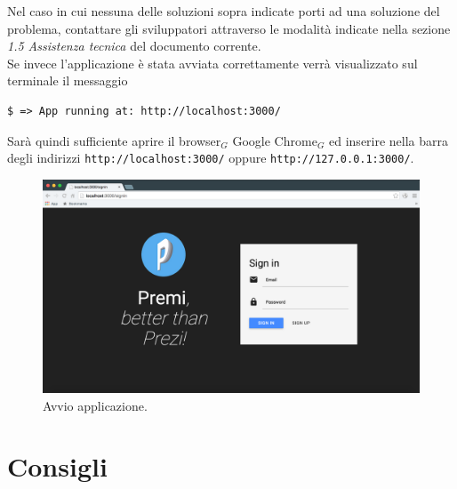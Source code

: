 \noindent Nel caso in cui nessuna delle soluzioni sopra indicate porti ad una soluzione del problema, contattare gli sviluppatori attraverso le modalità indicate nella sezione \emph{1.5 Assistenza tecnica} del documento corrente.\\

Se invece l'applicazione è stata avviata correttamente verrà visualizzato sul terminale il messaggio 

\begin{lstlisting}[style=DOS]
	$ => App running at: http://localhost:3000/
\end{lstlisting}

Sarà quindi sufficiente aprire il browser$_G$ Google Chrome$_G$ ed inserire nella barra degli indirizzi \verb+http://localhost:3000/+ oppure \verb+http://127.0.0.1:3000/+.

\begin{figure}[!h]
\begin{center}
\includegraphics[scale=0.3]{img/app_started.png}
\caption{Avvio applicazione.}
\end{center}
\end{figure}

\section{Consigli}